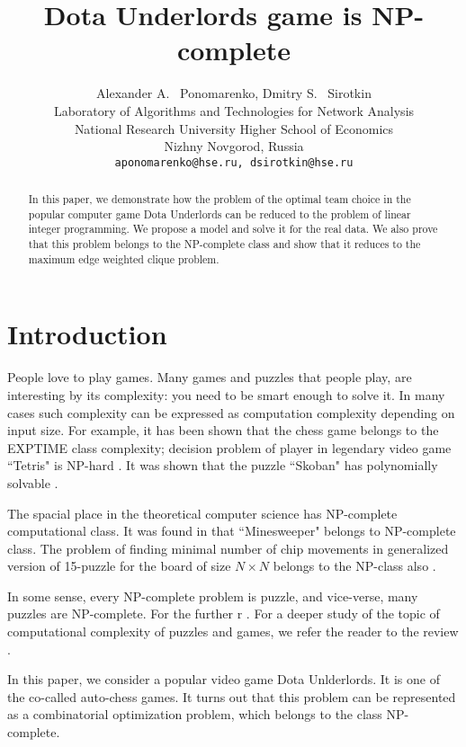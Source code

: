 \documentclass{article}
\title{Dota Underlords game is NP-complete}
\author{
  Alexander A. ~Ponomarenko, Dmitry S. ~Sirotkin \\
  Laboratory of Algorithms and Technologies for Network Analysis\\
  National Research University Higher School of Economics \\
  Nizhny Novgorod, Russia\\
  \texttt{aponomarenko@hse.ru, dsirotkin@hse.ru} \\
}
\begin{document}
\maketitle

\begin{abstract}
In this paper, we demonstrate how the problem of the optimal team choice in the popular computer game Dota Underlords can be reduced to the problem of linear integer  programming. We propose a model and solve it for the real data. We also prove that this problem belongs to the NP-complete class and show that it reduces to the maximum edge weighted clique problem.

\end{abstract}




\section{Introduction}
People love to play games. Many games and puzzles that people play, are interesting by its complexity: you need to be smart  enough to solve it. In many cases such complexity can be expressed as computation complexity depending on input size. For example, it has been shown \cite{fraenkel1981computing} that the chess game belongs to the EXPTIME class complexity; 
decision problem of player in legendary video game ``Tetris" is NP-hard \cite{breukelaar2004tetris}. It was shown that the puzzle ``Skoban"  has polynomially solvable \cite{hearn2005pspace}.

The spacial place in the theoretical computer science has NP-complete computational class.
It was found in \cite{kaye2000minesweeper} that ``Minesweeper" belongs to NP-complete class. The problem of finding minimal number of chip movements in generalized version of 15-puzzle for the board of size $N \times N$ belongs to the NP-class also  \cite{ratner1986finding}.

In some sense, every NP-complete problem is puzzle, and vice-verse, many puzzles are NP-complete. For the further r . For a deeper study of the topic of computational complexity of puzzles and games, we refer the reader to the review \cite{costa2018computational}.

In this paper, we consider a popular video game Dota Unlderlords. It is one of the co-called  auto-chess games. It turns out that this problem can be represented as a combinatorial optimization problem, which belongs to the class NP-complete.
\end{document}

